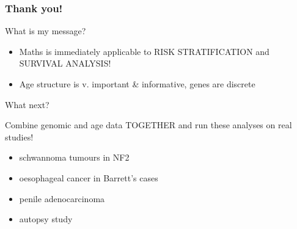 \documentclass{beamer}
\begin{document}
\begin{frame}
    \frametitle{Thank you!}
    What is my message?
    \begin{itemize}
        \item Maths is immediately applicable to RISK STRATIFICATION and
        SURVIVAL ANALYSIS!
        \item Age structure is v. important \& informative, genes are discrete
    \end{itemize}

    What next?
    \;

    Combine genomic and age data TOGETHER and run these analyses on real studies!
    \begin{itemize}
        \item schwannoma tumours in NF2
        \item oesophageal cancer in Barrett's cases
        \item penile adenocarcinoma
        \item autopsy study
    \end{itemize}
\end{frame}
\end{document}
